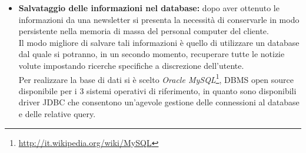 \begin{itemize}
\item \textbf{Salvataggio delle informazioni nel database:} dopo aver ottenuto le informazioni da una newsletter si presenta la necessità di conservarle in modo persistente nella memoria di massa del personal computer del cliente.\\
Il modo migliore di salvare tali informazioni è quello di utilizzare un database dal quale si potranno, in un secondo momento, recuperare tutte le notizie volute impostando ricerche specifiche a discrezione dell'utente.\\
Per realizzare la base di dati si è scelto \emph{Oracle MySQL}\footnote{\url{http://it.wikipedia.org/wiki/MySQL}}, DBMS open source disponibile per i 3 sistemi operativi di riferimento, in quanto sono disponibili driver JDBC che consentono un'agevole gestione delle connessioni al database e delle relative query.
\end{itemize}